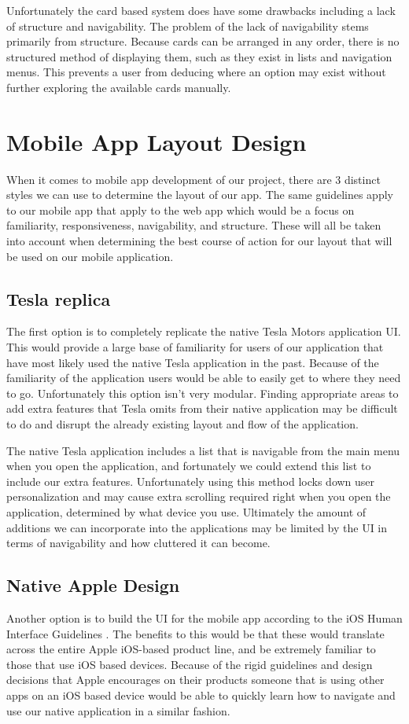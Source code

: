 \documentclass[10pt,draftclsnofoot,onecolumn,journal,compsoc]{IEEEtran}
\begin{document}
Unfortunately the card based system does have some drawbacks including a lack of structure and navigability. The problem of the lack of navigability stems primarily from structure. Because cards can be arranged in any order, there is no structured method of displaying them, such as they exist in lists and navigation menus. This prevents a user from deducing where an option may exist without further exploring the available cards manually. 

\section{Mobile App Layout Design}
When it comes to mobile app development of our project, there are 3 distinct styles we can use to determine the layout of our app. The same guidelines apply to our mobile app that apply to the web app which would be a focus on familiarity, responsiveness, navigability, and structure. These will all be taken into account when determining the best course of action for our layout that will be used on our mobile application. 

\subsection{Tesla replica}
The first option is to completely replicate the native Tesla Motors application UI. This would provide a large base of familiarity for users of our application that have most likely used the native Tesla application in the past. Because of the familiarity of the application users would be able to easily get to where they need to go. Unfortunately this option isn't very modular. Finding appropriate areas to add extra features that Tesla omits from their native application may be difficult to do and disrupt the already existing layout and flow of the application. 

The native Tesla application includes a list that is navigable from the main menu when you open the application, and fortunately we could extend this list to include our extra features. Unfortunately using this method locks down user personalization and may cause extra scrolling required right when you open the application, determined by what device you use. Ultimately the amount of additions we can incorporate into the applications may be limited by the UI in terms of navigability and how cluttered it can become. 

\subsection{Native Apple Design}
Another option is to build the UI for the mobile app according to the iOS Human Interface Guidelines \cite{iosInterface}. The benefits to this would be that these would translate across the entire Apple iOS-based product line, and be extremely familiar to those that use iOS based devices. Because of the rigid guidelines and design decisions that Apple encourages on their products someone that is using other apps on an iOS based device would be able to quickly learn how to navigate and use our native application in a similar fashion. 
\end{document}
